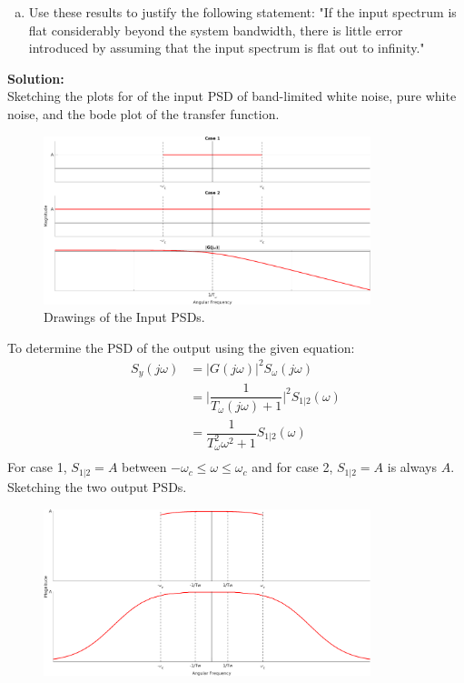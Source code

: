 \documentclass[11pt]{article}
\newcommand{\solution}{\textbf{Solution: \\}}
\begin{document}
\begin{enumerate}[label=\textbf{\arabic*.}]
\begin{enumerate}[(a)]
    \item Use these results to justify the following statement:
    "If the input spectrum is flat considerably beyond the system bandwidth, 
    there is little error introduced by assuming that the input spectrum is 
    flat out to infinity."
  \end{enumerate}
  \solution
  Sketching the plots for of the input PSD of band-limited white noise, pure white noise, 
  and the bode plot of the transfer function.
  \begin{figure}[H]
    \centering
    \includegraphics[width=0.85\textwidth]{5a.png}
    \caption{Drawings of the Input PSDs.}
  \end{figure}
  To determine the PSD of the output using the given equation:
  \begin{equation*}
    \begin{split}
      S_y(j\omega) &= |G(j\omega)|^2 S_{\omega}(j\omega) \\
      &= \biggr| \dfrac{1}{T_{\omega}(j\omega) + 1} \biggr|^2 S_{1|2}(\omega) \\
      &= \dfrac{1}{T_{\omega}^2 \omega^2 + 1} S_{1|2}(\omega) \\
    \end{split}
  \end{equation*}
  For case 1, $S_{1|2} = A$ between $-\omega_c \le \omega \le \omega_c$ and for case 
  2, $S_{1|2} = A$ is always $A$. Sketching the two output PSDs. 
  \begin{figure}[H]
    \centering
    \includegraphics[width=0.85\textwidth]{5b.png}

\end{figure}
\end{enumerate}
\end{document}
